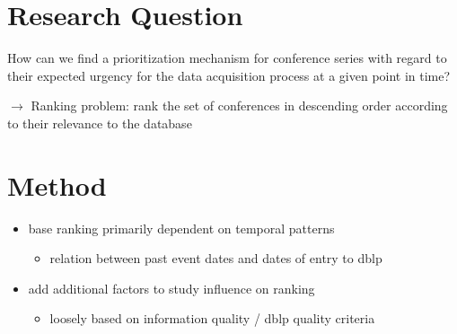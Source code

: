 \documentclass[xcolor={svgnames}]{beamer}
\makeatletter
\newcommand*{\currentname}{\@currentlabelname}
\makeatother
\begin{document}
\section{Research Question}

\begin{frame}{\currentname}{}\linespread{1.5}
  \bigskip

  How can we find a prioritization mechanism for conference series with regard to their expected urgency for the data acquisition process at a given point in time?

  \bigskip

  \( \rightarrow \)  Ranking problem:  rank the set of conferences in descending order according to their relevance to the database
\end{frame}

\section{Method}
\begin{frame}{\currentname}\linespread{1.5}
  \begin{itemize}
    \item base ranking primarily dependent on temporal patterns
    \begin{itemize}
      \item relation between past event dates and dates of entry to dblp %
    \end{itemize}
    \item add additional factors to study influence on ranking
    \begin{itemize}
      \item loosely based on information quality / dblp quality criteria %
    \end{itemize}
  \end{itemize}

\end{frame}
\end{document}
